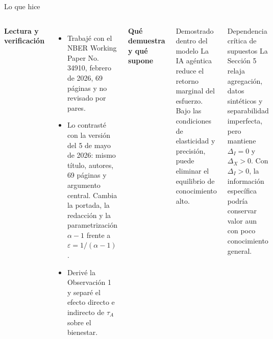 \documentclas\documentclass[aspectratio=169,11pt]{beamer}
\newcommand{\azul}[1]{\textcolor{AzulMedio}{\textbf{#1}}}
\begin{document}
\begin{frame}{Lo que hice}
\begin{columns}[T,onlytextwidth]
\azul{Lectura y verificación}
\begin{itemize}\footnotesize
  \item Trabajé con el NBER Working Paper No. 34910, febrero de 2026, 69 páginas y no revisado por pares.
  \item Lo contrasté con la versión del 5 de mayo de 2026: mismo título, autores, 69 páginas y argumento central. Cambia la portada, la redacción y la parametrización $\alpha-1$ frente a $\varepsilon=1/(\alpha-1)$.
  \item Derivé la Observación 1 y separé el efecto directo e indirecto de $\tau_A$ sobre el bienestar.
\end{itemize}

\azul{Qué demuestra y qué supone}
\begin{block}{Demostrado dentro del modelo}
\small La IA agéntica reduce el retorno marginal del esfuerzo. Bajo las condiciones de elasticidad y precisión, puede eliminar el equilibrio de conocimiento alto.
\end{block}
\begin{block}{Dependencia crítica de supuestos}
\small La Sección 5 relaja agregación, datos sintéticos y separabilidad imperfecta, pero mantiene $\Delta_I=0$ y $\Delta_X>0$. Con $\Delta_I>0$, la información específica podría conservar valor aun con poco conocimiento general.
\end{block}
\end{columns}
\end{frame}
\end{document}
